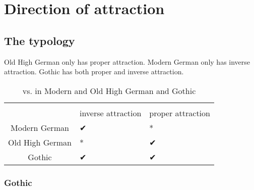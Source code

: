 
\chapter{Direction of attraction}


\section{The typology}
Old High German only has proper attraction. Modern German only has inverse attraction. Gothic has both proper and inverse attraction.


\begin{table}[h]\label{tbl:intextgoth}
	\center
	\caption { vs.  in Modern and Old High German and Gothic}
	\begin{minipage}{0.6\linewidth}
		\begin{tabularx}{\textwidth}{c *{2}{Y}}
		\toprule
		 								& 				& 				\\
										& inverse attraction	& proper attraction		\\
		\midrule
		Modern German 	& ✔			 							&	*										\\
		Old High German	& *										&	✔										\\
		Gothic					&	✔										&	✔										\\
		\bottomrule
		\end{tabularx}
	\end{minipage}
\end{table}



\subsection{Gothic}

